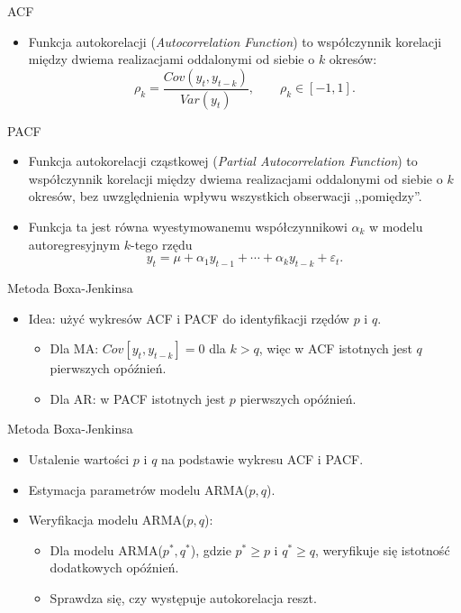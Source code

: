 \documentclass[11pt,usenames,dvipsnames,aspectratio=169]{beamer}
\begin{document}
\begin{frame}{ACF}
\begin{itemize}
    \item Funkcja autokorelacji (\emph{Autocorrelation Function}) to współczynnik korelacji między dwiema realizacjami oddalonymi od siebie o $k$ okresów:
    \[
    \rho_{k}=\frac{Cov(y_{t},y_{t-k})}{Var(y_{t})},\qquad \rho_{k}\in[-1,1].
    \]
\end{itemize}
\end{frame}

\begin{frame}{PACF}
\begin{itemize}
    \item Funkcja autokorelacji cząstkowej (\emph{Partial Autocorrelation Function}) to współczynnik korelacji między dwiema realizacjami oddalonymi od siebie o $k$ okresów, bez uwzględnienia wpływu wszystkich obserwacji ,,pomiędzy''.
    \item Funkcja ta jest równa wyestymowanemu współczynnikowi $\alpha_{k}$ w modelu autoregresyjnym $k$-tego rzędu
    \[
    y_{t}=\mu+\alpha_{1}y_{t-1}+\cdots+\alpha_{k}y_{t-k}+\varepsilon_{t}.
    \]
\end{itemize}
\end{frame}

\begin{frame}{Metoda Boxa-Jenkinsa}
\begin{itemize}
    \item Idea: użyć wykresów ACF i PACF do identyfikacji rzędów $p$ i $q$.
    \begin{itemize}
        \item Dla MA: $Cov[y_{t},y_{t-k}]=0$ dla $k>q$, więc w ACF istotnych jest $q$ pierwszych opóźnień.
        \item Dla AR: w PACF istotnych jest $p$ pierwszych opóźnień.
    \end{itemize}
\end{itemize}
\end{frame}

\begin{frame}{Metoda Boxa-Jenkinsa}
\begin{itemize}
    \item Ustalenie wartości $p$ i $q$ na podstawie wykresu ACF i PACF.
    \item Estymacja parametrów modelu ARMA($p,q$).
    \item Weryfikacja modelu ARMA($p,q$):
    \begin{itemize}
        \item Dla modelu ARMA($p^{*},q^{*}$), gdzie $p^{*}\geq p$ i $q^{*}\geq q$, weryfikuje się istotność dodatkowych opóźnień.
        \item Sprawdza się, czy występuje autokorelacja reszt.
    \end{itemize}
\end{itemize}
\end{frame}
\end{document}
